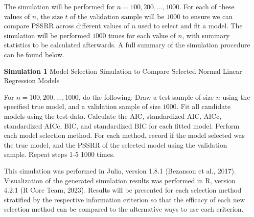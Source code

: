 		The simulation will be performed for $n = 100,200,...,1000$. For each of these values of $n$, the size $t$ of the validation sample will be
		$1000$ to ensure we can compare PSSRR across different values of $n$ used to select and fit a model. The simulation will be performed $1000$ times for each value of $n$,
		with summary statistics to be calculated afterwards. A full summary of the simulation procedure can be found below.
		\begin{algorithm}[H]
			\caption*{\textbf{Simulation 1} Model Selection Simulation to Compare Selected Normal Linear Regression Models}
			\begin{algorithmic}[1]
			  \Statex For $n = 100,200,...,1000$, do the following:
			  \State Draw a test sample of size $n$ using the specified true model, and a validation sample of size $1000$.
			  \State Fit all candidate models using the test data.
			  \State Calculate the AIC, standardized AIC, AICc, standardized AICc, BIC, and standardized BIC for each fitted model.
			  \State Perform each model selection method.
			  \State For each method, record if the model selected was the true model, and the PSSRR of the selected model using the validation sample.
			  \State Repeat steps 1-5 1000 times.
			\end{algorithmic}
		\end{algorithm}

		This simulation was performed in Julia, version 1.8.1 (Bezanson et al., 2017). Visualization of the generated simulation results was performed in R, version 4.2.1 (R Core Team, 2023).
		Results will be presented for each selection method stratified by the respective information criterion so that the efficacy of each new selection method can be compared to the
		alternative ways to use each criterion.

